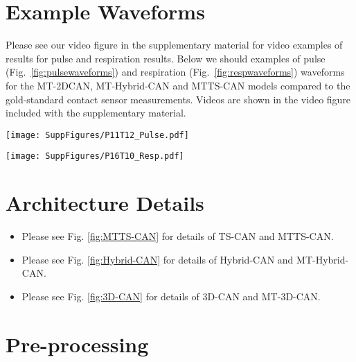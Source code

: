 \documentclass{article}
\begin{document}
\small



\newpage
\section{Example Waveforms}

Please see our video figure in the supplementary material for video examples of results for pulse and respiration results. Below we should examples of pulse (Fig.~\ref{fig:pulsewaveforms}) and respiration (Fig.~\ref{fig:respwaveforms}) waveforms for the MT-2DCAN, MT-Hybrid-CAN and MTTS-CAN models compared to the gold-standard contact sensor measurements.  Videos are shown in the video figure included with the supplementary material.

\begin{figure*}[h]
  \texttt{[image: SuppFigures/P11T12\_Pulse.pdf]}
  \caption{Examples of pulse wave predictions from MT-2DCAN, MT-Hybrid-CAN and MTTS-CAN.  Notice how the agreement with the gold-standard measurements (blue) is highest for MT-Hybrid-CAN and MTTS-CAN.}
  \label{fig:pulsewaveforms}
\end{figure*}
\begin{figure*}[h]
  \texttt{[image: SuppFigures/P16T10\_Resp.pdf]}
  \caption{Examples of respiration wave predictions from MT-2DCAN, MT-Hybrid-CAN and MTTS-CAN.  Notice how the agreement with the gold-standard measurements (blue) is highest for MTTS-CAN.}
  \label{fig:respwaveforms}
\end{figure*}


\section{Architecture Details}

\begin{itemize}
    \item Please see Fig. \ref{fig:MTTS-CAN} for details of TS-CAN and MTTS-CAN. 
    \item Please see Fig. \ref{fig:Hybrid-CAN} for details of Hybrid-CAN and MT-Hybrid-CAN.
    \item Please see Fig. \ref{fig:3D-CAN} for details of 3D-CAN and MT-3D-CAN.
 \end{itemize}





\section{Pre-processing}
\end{document}
